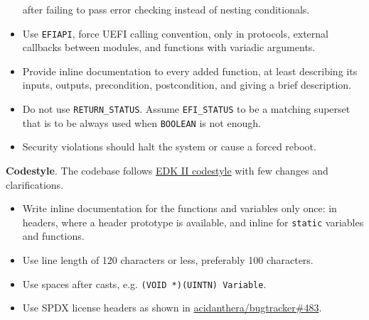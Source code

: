 \documentclass[]{article}
\providecommand{\tightlist}{%
  \setlength{\itemsep}{0pt}\setlength{\parskip}{0pt}}
\begin{document}
\begin{itemize}
after failing to pass error checking instead of nesting conditionals.
\item Use \texttt{EFIAPI}, force UEFI calling convention, only in protocols, external callbacks between
modules, and functions with variadic arguments.
\item Provide inline documentation to every added function, at least describing its inputs, outputs,
precondition, postcondition, and giving a brief description.
\item Do not use \texttt{RETURN\_STATUS}. Assume \texttt{EFI\_STATUS} to be a matching superset that is
to be always used when \texttt{BOOLEAN} is not enough.
\item Security violations should halt the system or cause a forced reboot.
\end{itemize}

\textbf{Codestyle}. The codebase follows
\href{https://github.com/tianocore/tianocore.github.io/wiki/Code-Style-C}{EDK II codestyle} with few changes
and clarifications.
\begin{itemize}
\tightlist
\item Write inline documentation for the functions and variables only once: in headers, where a header prototype
is available, and inline for \texttt{static} variables and functions.
\item Use line length of 120 characters or less, preferably 100 characters.
\item Use spaces after casts, e.g. \texttt{(VOID *)(UINTN) Variable}.
\item Use SPDX license headers as shown in
\href{https://github.com/acidanthera/bugtracker/issues/483}{acidanthera/bugtracker\#483}.
\end{itemize}
\end{document}
